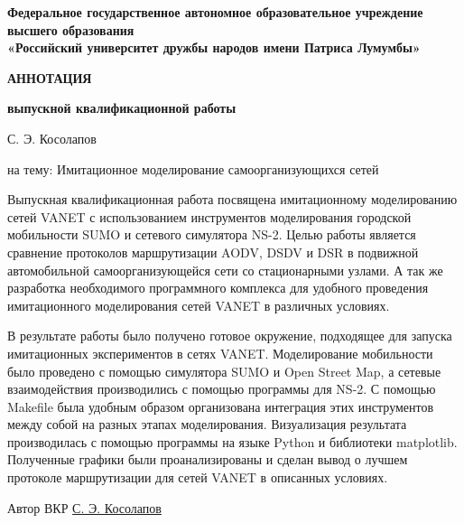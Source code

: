 \thispagestyle{empty}

  \begin{center}

    \textbf{Федеральное государственное автономное образовательное учреждение \\
высшего образования} \\
\textbf{«Российский университет дружбы народов имени Патриса Лумумбы»}

\hfill

\textbf{АННОТАЦИЯ}

\textbf{выпускной квалификационной работы }

\vspace{1cm}

С. Э. Косолапов

\vspace{1cm}
на тему: Имитационное моделирование самоорганизующихся сетей
\end{center}

\vspace{1cm}


Выпускная квалификационная работа посвящена имитационному
моделированию сетей VANET с использованием инструментов моделирования городской мобильности SUMO и сетевого симулятора NS-2. Целью работы является сравнение протоколов маршрутизации AODV, DSDV и DSR в подвижной автомобильной самоорганизующейся сети со стационарными узлами. А так же разработка необходимого программного комплекса для удобного проведения имитационного моделирования сетей VANET в различных условиях.

В результате работы было получено готовое окружение, подходящее для запуска имитационных экспериментов в сетях VANET. Моделирование мобильности было проведено с помощью симулятора SUMO и Open Street Map, а сетевые взаимодействия производились с помощью программы для NS-2. С помощью Makefile была удобным образом организована интеграция этих инструментов между собой на разных этапах моделирования. Визуализация результата производилась с помощью программы на языке Python и библиотеки matplotlib. Полученные графики были проанализированы и сделан вывод о лучшем протоколе маршрутизации для сетей VANET в описанных условиях.

\hfill

Автор ВКР \hspace{1cm} \underline{\hspace{3cm}} \hspace{1cm} \underline{С. Э. Косолапов }
